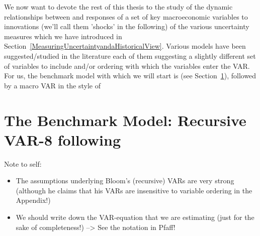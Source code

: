 \documentclass[a4paper,11pt,listof=nochaptergap,oneside,pointednumbers,bibtotoc,bigheadings,liststotoc]{scrbook}
\begin{document}
\endgroup

We now want to devote the rest of this thesis to the study of the dynamic relationships between and responses of a set of key macroeconomic variables to innovations (we'll call them 'shocks' in the following) of the various uncertainty measures which we have introduced in Section~\ref{MeasuringUncertaintyandaHistoricalView}. Various models have been suggested/studied in the literature each of them suggesting a slightly different set of variables to include and/or ordering with which the variables enter the VAR. For us, the benchmark model with which we will start is \citet{bloom:09} (see Section~\ref{sec:VAR8}), followed by a macro VAR in the style of \citet{christianoetal:05} 

\section{The Benchmark Model: Recursive VAR-8 following \citet{bloom:09}}
\label{sec:VAR8}


\begingroup
    \fontsize{8pt}{12pt}\selectfont
    Note to self:
\begin{itemize}
	\item The assumptions underlying Bloom's (recursive) VARs are very strong (although he claims that his VARs are insensitive to variable ordering in the Appendix!)
	\item We should write down the VAR-equation that we are estimating (just for the sake of completeness!) --> See the notation in Pfaff!
\end{itemize}
\endgroup
\end{document}
